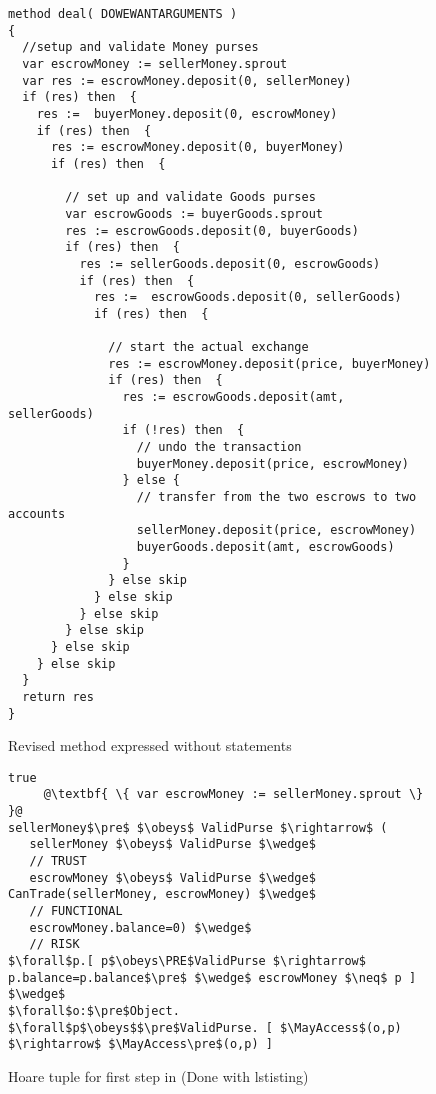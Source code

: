 \begin{figure*}[htb]
\begin{lstlisting}
method deal( DOWEWANTARGUMENTS )
{
  //setup and validate Money purses
  var escrowMoney := sellerMoney.sprout
  var res := escrowMoney.deposit(0, sellerMoney)
  if (res) then  {
    res :=  buyerMoney.deposit(0, escrowMoney)
    if (res) then  {
      res := escrowMoney.deposit(0, buyerMoney)
      if (res) then  {

        // set up and validate Goods purses
        var escrowGoods := buyerGoods.sprout
        res := escrowGoods.deposit(0, buyerGoods)
        if (res) then  {
          res := sellerGoods.deposit(0, escrowGoods)
          if (res) then  {
            res :=  escrowGoods.deposit(0, sellerGoods)
            if (res) then  {

              // start the actual exchange
              res := escrowMoney.deposit(price, buyerMoney)
              if (res) then  {
                res := escrowGoods.deposit(amt, sellerGoods)
                if (!res) then  {
                  // undo the transaction
                  buyerMoney.deposit(price, escrowMoney)
                } else {
                  // transfer from the two escrows to two accounts
                  sellerMoney.deposit(price, escrowMoney)
                  buyerGoods.deposit(amt, escrowGoods)
                }
              } else skip
            } else skip
          } else skip
        } else skip
      } else skip
    } else skip
  }
  return res
}
\end{lstlisting}
\caption{Revised  method expressed without {} statements}
\label{fig:DealV3}
\end{figure*}

\newcommand{\bothfigs}{fig.~\ref{fig:DealV2Consolidated} or \ref{fig:DealV3}}

\newpage

\begin{figure*}[htb]
\begin{lstlisting}[escapechar=@]
true
     @\textbf{ \{ var escrowMoney := sellerMoney.sprout \} }@
sellerMoney$\pre$ $\obeys$ ValidPurse $\rightarrow$ (
   sellerMoney $\obeys$ ValidPurse $\wedge$
   // TRUST
   escrowMoney $\obeys$ ValidPurse $\wedge$ CanTrade(sellerMoney, escrowMoney) $\wedge$
   // FUNCTIONAL
   escrowMoney.balance=0) $\wedge$
   // RISK
$\forall$p.[ p$\obeys\PRE$ValidPurse $\rightarrow$ p.balance=p.balance$\pre$ $\wedge$ escrowMoney $\neq$ p ]  $\wedge$
$\forall$o:$\pre$Object. $\forall$p$\obeys$$\pre$ValidPurse. [ $\MayAccess$(o,p) $\rightarrow$ $\MayAccess\pre$(o,p) ]
\end{lstlisting}
\caption{Hoare tuple for first step in  (Done with lstisting)}
\label{fig:DealV3:S1}
\end{figure*}



